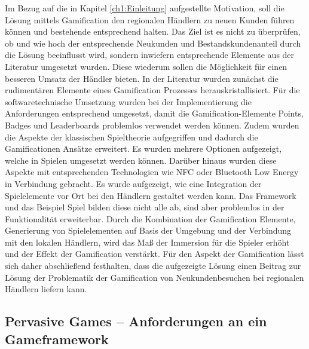 Im Bezug auf die in Kapitel \ref{ch1:Einleitung} aufgestellte Motivation, soll die Lösung mittels Gamification den regionalen Händlern zu neuen Kunden führen können und bestehende entsprechend halten. Das Ziel ist es nicht zu überprüfen, ob und wie hoch der entsprechende Neukunden und Bestandskundenanteil durch die Lösung beeinflusst wird, sondern inwiefern entsprechende Elemente aus der Literatur umgesetzt wurden. Diese wiederum sollen die Möglichkeit für einen besseren Umsatz der Händler bieten.
In der Literatur wurden zunächst die rudimentären Elemente eines Gamification Prozesses herauskristallisiert. Für die softwaretechnische Umsetzung wurden bei der Implementierung die Anforderungen entsprechend umgesetzt, damit die Gamification-Elemente Points, Badges und Leaderboards problemlos verwendet werden können. Zudem wurden die Aspekte der klassischen Spieltheorie aufgegriffen und dadurch die Gamificationen Ansätze erweitert. Es wurden mehrere Optionen aufgezeigt, welche in Spielen umgesetzt werden können. Darüber hinaus wurden diese Aspekte mit entsprechenden Technologien wie NFC oder Bluetooth Low Energy in Verbindung gebracht. Es wurde aufgezeigt, wie eine Integration der Spielelemente vor Ort bei den Händlern gestaltet werden kann. Das Framework und das Beispiel Spiel bilden diese nicht alle ab, sind aber problemlos in der Funktionalität erweiterbar.
Durch die Kombination der Gamification Elemente, Generierung von Spielelementen auf Basis der Umgebung und der Verbindung mit den lokalen Händlern, wird das Maß der Immersion für die Spieler erhöht und der Effekt der Gamification verstärkt.
Für den Aspekt der Gamification lässt sich daher abschließend festhalten, dass die aufgezeigte Lösung einen Beitrag zur Lösung der Problematik der Gamification von Neukundenbesuchen bei regionalen Händlern liefern kann.

\subsection*{Pervasive Games  -- Anforderungen an ein Gameframework}

